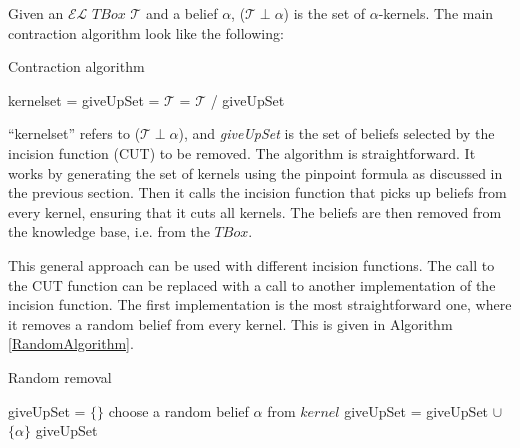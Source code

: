 Given an $\mathcal{EL}$ $TBox$ $\mathcal{T}$ and a belief $\alpha$, ($\mathcal{T} \perp \alpha$) is the set of $\alpha$-kernels. The main contraction algorithm look like the following:

\begin{algorithm}
\caption{Contraction algorithm}
\label{MainAlgorithm}
\begin{algorithmic}[1]
\State kernelset = 
\State giveUpSet = 
\State $\mathcal{T}$ = $\mathcal{T}$ / giveUpSet
\EndProcedure
\end{algorithmic}
\end{algorithm}

``kernelset'' refers to ($\mathcal{T} \perp \alpha$), and \textit{giveUpSet} is the set of beliefs selected by the incision function (CUT) to be removed. The algorithm is straightforward. It works by generating the set of kernels using the pinpoint formula as discussed in the previous section. Then it calls the incision function that picks up beliefs from every kernel, ensuring that it cuts all kernels. The beliefs are then removed from the knowledge base, i.e. from the $TBox$.

This general approach can be used with different incision functions. The call to the CUT function can be replaced with a call to another implementation of the incision function. The first implementation is the most straightforward one, where it removes a random belief from every kernel. This is given in Algorithm \ref{RandomAlgorithm}.

\begin{algorithm}
\caption{Random removal}
\label{RandomAlgorithm}
\begin{algorithmic}[1]
\State giveUpSet = $\lbrace \rbrace$
\State choose a random belief $\alpha$ from $kernel$
\State giveUpSet = giveUpSet $\cup$ $\lbrace \alpha \rbrace$
\EndFor \State
\Return giveUpSet
\EndFunction
\end{algorithmic}
\end{algorithm}

